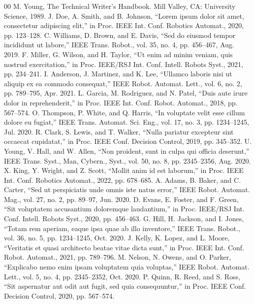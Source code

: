 \documentclass[conference]{IEEEtran}
\begin{document}
\newpage
\begin{thebibliography}{00}
 M. Young, The Technical Writer's Handbook. Mill Valley, CA: University Science, 1989.
 J. Doe, A. Smith, and B. Johnson, ``Lorem ipsum dolor sit amet, consectetur adipiscing elit,'' in Proc. IEEE Int. Conf. Robotics Automat., 2020, pp. 123--128.
 C. Williams, D. Brown, and E. Davis, ``Sed do eiusmod tempor incididunt ut labore,'' IEEE Trans. Robot., vol. 35, no. 4, pp. 456--467, Aug. 2019.
 F. Miller, G. Wilson, and H. Taylor, ``Ut enim ad minim veniam, quis nostrud exercitation,'' in Proc. IEEE/RSJ Int. Conf. Intell. Robots Syst., 2021, pp. 234--241.
 I. Anderson, J. Martinez, and K. Lee, ``Ullamco laboris nisi ut aliquip ex ea commodo consequat,'' IEEE Robot. Automat. Lett., vol. 6, no. 2, pp. 789--795, Apr. 2021.
 L. Garcia, M. Rodriguez, and N. Patel, ``Duis aute irure dolor in reprehenderit,'' in Proc. IEEE Int. Conf. Robot. Automat., 2018, pp. 567--574.
 O. Thompson, P. White, and Q. Harris, ``In voluptate velit esse cillum dolore eu fugiat,'' IEEE Trans. Automat. Sci. Eng., vol. 17, no. 3, pp. 1234--1245, Jul. 2020.
 R. Clark, S. Lewis, and T. Walker, ``Nulla pariatur excepteur sint occaecat cupidatat,'' in Proc. IEEE Conf. Decision Control, 2019, pp. 345--352.
 U. Young, V. Hall, and W. Allen, ``Non proident, sunt in culpa qui officia deserunt,'' IEEE Trans. Syst., Man, Cybern., Syst., vol. 50, no. 8, pp. 2345--2356, Aug. 2020.
 X. King, Y. Wright, and Z. Scott, ``Mollit anim id est laborum,'' in Proc. IEEE Int. Conf. Robotics Automat., 2022, pp. 678--685.
 A. Adams, B. Baker, and C. Carter, ``Sed ut perspiciatis unde omnis iste natus error,'' IEEE Robot. Automat. Mag., vol. 27, no. 2, pp. 89--97, Jun. 2020.
 D. Evans, E. Foster, and F. Green, ``Sit voluptatem accusantium doloremque laudantium,'' in Proc. IEEE/RSJ Int. Conf. Intell. Robots Syst., 2020, pp. 456--463.
 G. Hill, H. Jackson, and I. Jones, ``Totam rem aperiam, eaque ipsa quae ab illo inventore,'' IEEE Trans. Robot., vol. 36, no. 5, pp. 1234--1245, Oct. 2020.
 J. Kelly, K. Lopez, and L. Moore, ``Veritatis et quasi architecto beatae vitae dicta sunt,'' in Proc. IEEE Int. Conf. Robot. Automat., 2021, pp. 789--796.
 M. Nelson, N. Owens, and O. Parker, ``Explicabo nemo enim ipsam voluptatem quia voluptas,'' IEEE Robot. Automat. Lett., vol. 5, no. 4, pp. 2345--2352, Oct. 2020.
 P. Quinn, R. Reed, and S. Ross, ``Sit aspernatur aut odit aut fugit, sed quia consequuntur,'' in Proc. IEEE Conf. Decision Control, 2020, pp. 567--574.

\end{thebibliography}
\end{document}
